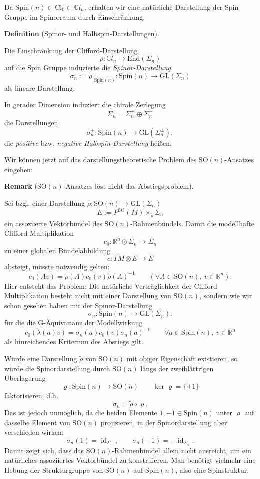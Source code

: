 \documentclass[10pt, letterpaper]{article}
\newcommand{\id}{\operatorname{id}}
\newcommand{\R}{\mathbb{R}}
\newcommand{\C}{\mathbb{C}}
\newcommand{\End}{\mathrm{End}}
\newcommand{\Cl}{\mathrm{Cl}}
\newcommand{\GL}{\mathrm{GL}}
\newcommand{\SO}{\mathrm{SO}}
\newcommand{\Spin}{\mathrm{Spin}}
\newcommand{\CustomHeading}[3]{%
  \par\medskip\noindent%
  \textbf{#1 #2} \textnormal{(#3)}.\enskip%
}
\newenvironment{DEF}[2]{\CustomHeading{Definition}{#1}{#2}}{}
\newenvironment{REM}[2]{\CustomHeading{Remark}{#1}{#2}}{}
\begin{document}
\bigskip

Da $\Spin(n)\subset \Cl_0\subset\C l_n$, erhalten wir eine natürliche Darstellung der Spin Gruppe im Spinorraum durch Einschränkung:

\begin{DEF}{}{Spinor- und Halbspin-Darstellungen}
Die Einschränkung der Clifford-Darstellung 
$$\rho: \C l_n\to \End (\Sigma_n)$$
auf die Spin Gruppe induzierte die \emph{Spinor-Darstellung}
\[
\sigma_n:=\rho|_{\Spin(n)}:\Spin(n)\to \GL(\Sigma_n)
\]
als lineare Darstellung.

In gerader Dimension induziert die chirale Zerlegung
\[
\Sigma_n=\Sigma_n^+\oplus \Sigma_n^-
\]
die Darstellungen
\[
\sigma_n^\pm:\Spin(n)\to \GL(\Sigma_n^\pm),
\]
die \emph{positive} bzw. \emph{negative Halbspin-Darstellung} heißen.
\end{DEF}


\bigskip





Wir können jetzt auf das darstellungstheoretische Problem des $\SO(n)$-Ansatzes eingehen:


\begin{REM}{}{\(\SO(n)\)-Ansatzes löst nicht das Abstiegsproblem}
Sei bzgl. einer Darstellung $\widetilde\rho:\SO(n)\to \GL(\Sigma_n)$
\[
E:=P^{\SO}(M)\times_{\widetilde\rho}\Sigma_n
\]
ein assoziierte Vektorbündel des $\SO(n)$-Rahmenbündels. Damit die modellhafte Clifford-Multiplikation
\[
c_0:\R^n\otimes \Sigma_n\to \Sigma_n
\]
zu einer globalen Bündelabbildung
\[
c:TM\otimes E\to E
\]
absteigt, müsste notwendig gelten:
\[
c_0(Av)=\widetilde\rho(A)c_0(v)\widetilde\rho(A)^{-1}
\qquad
(\forall A\in \SO(n),\ v\in \R^n).
\]
Hier entsteht das Problem: Die natürliche Verträglichkeit der Clifford-Multiplikation besteht nicht mit einer Darstellung von \(\SO(n)\), sondern wie wir schon gesehen haben mit der Spinor-Darstellung
\[
\sigma_n:\Spin(n)\to \GL(\Sigma_n).
\]
{\color{blue} für die die G-Äquivarianz der Modellwirkung
\[
c_0(\lambda(a)v)=\sigma_n(a)c_0(v)\sigma_n(a)^{-1}
\qquad
\forall a\in \Spin(n),\ v\in \R^n
\]
als hinreichendes Kriterium des Abstiegs gilt.}

Würde eine Darstellung \(\widetilde\rho\) von \(\SO(n)\) mit obiger Eigenschaft existieren, so würde die Spinordarstellung durch \(\SO(n)\) längs der zweiblättrigen Überlagerung
$$\varrho: \Spin(n)\to \SO(n)\qquad \ker \varrho=\{\pm 1\}$$
faktorisieren, d.h.
$$\sigma_n=\widetilde{\rho}\circ \varrho.$$
Das ist jedoch unmöglich, da die beiden Elemente \(1,-1\in \Spin(n)\) unter \(\varrho\) auf dasselbe Element von \(\SO(n)\) projizieren, in der Spinordarstellung aber verschieden wirken:
\[
\sigma_n(1)=\id_{\Sigma_n},
\qquad
\sigma_n(-1)=-\id_{\Sigma_n}.
\]
Damit zeigt sich, dass das \(\SO(n)\)-Rahmenbündel allein nicht ausreicht, um ein natürliches assoziiertes Vektorbündel zu konstruieren. Man benötigt vielmehr eine Hebung der Strukturgruppe von \(\SO(n)\) auf \(\Spin(n)\), also eine Spinstruktur.
\end{REM}
\end{document}

